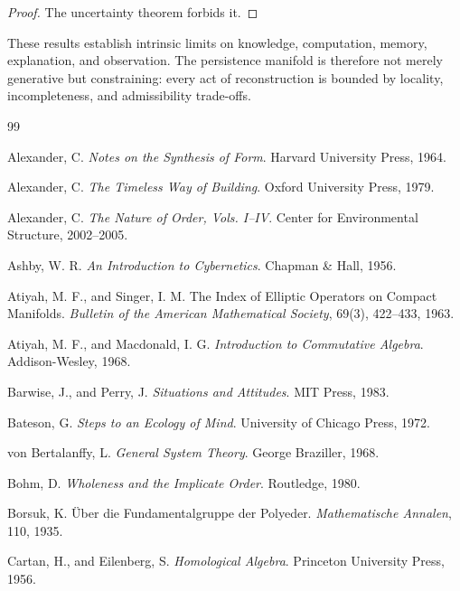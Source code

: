 \documentclass[12pt,oneside]{article}
\theoremstyle{definition}
\begin{document}
\begin{proof}

The uncertainty theorem forbids it.

\end{proof}

These results establish intrinsic limits on knowledge, computation, memory, explanation, and observation. The persistence manifold is therefore not merely generative but constraining: every act of reconstruction is bounded by locality, incompleteness, and admissibility trade-offs.

\newpage

\begin{thebibliography}{99}

Alexander, C.
\textit{Notes on the Synthesis of Form}.
Harvard University Press, 1964.

Alexander, C.
\textit{The Timeless Way of Building}.
Oxford University Press, 1979.

Alexander, C.
\textit{The Nature of Order, Vols. I--IV}.
Center for Environmental Structure, 2002--2005.

Ashby, W. R.
\textit{An Introduction to Cybernetics}.
Chapman \& Hall, 1956.

Atiyah, M. F., and Singer, I. M.
The Index of Elliptic Operators on Compact Manifolds.
\textit{Bulletin of the American Mathematical Society},
69(3), 422--433, 1963.

Atiyah, M. F., and Macdonald, I. G.
\textit{Introduction to Commutative Algebra}.
Addison-Wesley, 1968.

Barwise, J., and Perry, J.
\textit{Situations and Attitudes}.
MIT Press, 1983.

Bateson, G.
\textit{Steps to an Ecology of Mind}.
University of Chicago Press, 1972.

von Bertalanffy, L.
\textit{General System Theory}.
George Braziller, 1968.

Bohm, D.
\textit{Wholeness and the Implicate Order}.
Routledge, 1980.

Borsuk, K.
Über die Fundamentalgruppe der Polyeder.
\textit{Mathematische Annalen},
110, 1935.

Cartan, H., and Eilenberg, S.
\textit{Homological Algebra}.
Princeton University Press, 1956.


\end{thebibliography}
\end{document}

